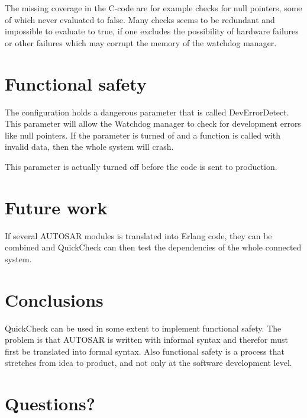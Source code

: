 \documentclass[a4paper]{article}
\begin{document}
The missing coverage in the C-code are for example checks for null
pointers, some of which never evaluated to false. Many checks seems to be
redundant and impossible to evaluate to true, if one excludes the possibility
of hardware failures or other failures which may corrupt the memory of the
watchdog manager.

\section{Functional safety}
The configuration holds a dangerous parameter that is called
DevErrorDetect. This parameter will allow the Watchdog manager to
check for development errors like null pointers. If the parameter is
turned of and a function is called with invalid data, then the whole
system will crash.

This parameter is actually turned off before the code is sent to production.

\section{Future work}
If several AUTOSAR modules is translated into Erlang code, they can be
combined and QuickCheck can then test the dependencies of the whole
connected system.

\section{Conclusions}
QuickCheck can be used in some extent to implement functional
safety. The problem is that AUTOSAR is written with informal syntax
and therefor must first be translated into formal syntax. Also
functional safety is a process that stretches from idea to product,
and not only at the software development level.

\section{Questions?}
\end{document}
